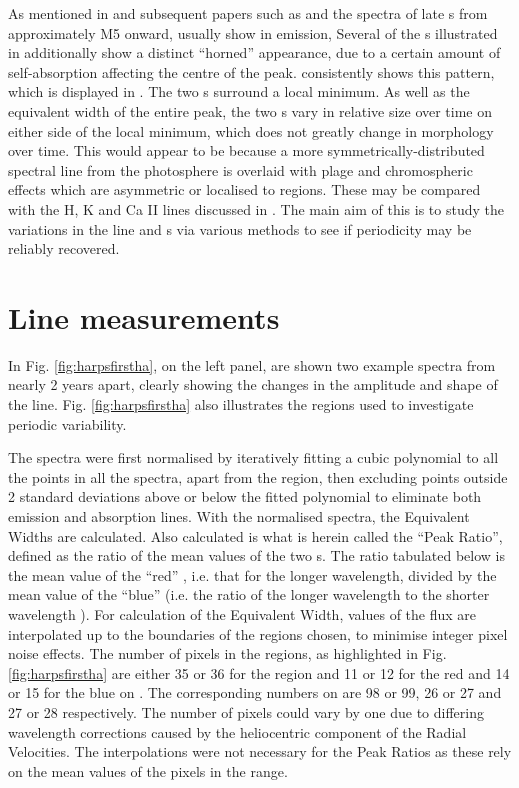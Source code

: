 As mentioned in \citet{mohanty03} and subsequent papers such as \citet{jenkins09} and \citet{barnes14} the spectra of
late \rdwarf s from approximately M5 onward, usually show {\ha} in emission, Several of the \rdwarf s illustrated in
\citet[Fig. 6]{barnes14} additionally show a distinct ``horned'' appearance, due to a certain amount of self-absorption
affecting the centre of the {\ha} peak. {\prox} consistently shows this pattern, which is displayed in
\citet[fig. 14]{fuhrmeister11}. The two \horn s surround a local minimum. As well as the equivalent width of the entire
{\ha} peak, the two \horn s vary in relative size over time on either side of the local minimum, which does not greatly
change in morphology over time. This would appear to be because a more symmetrically-distributed spectral line from the
photosphere is overlaid with plage and chromospheric effects which are asymmetric or localised to regions. These may be
compared with the H, K and Ca II lines discussed in \citet{rauscher06}. The main aim of this {\paperorthesis} is to
study the variations in the line and \horn s via various methods to see if periodicity may be reliably recovered.

\section{{\ha} Line measurements}
\protect\label{section:linemeas}

In Fig. \ref{fig:harpsfirstha}, on the left panel, are shown two example spectra from {\harps} nearly 2 years apart,
clearly showing the changes in the amplitude and shape of the {\ha} line. Fig. \ref{fig:harpsfirstha} also illustrates
the regions used to investigate periodic variability.

The spectra were first normalised by iteratively fitting a cubic polynomial to all the points in all the spectra, apart
from the {\ha} region, then excluding points outside 2 standard deviations above or below the fitted polynomial to
eliminate both emission and absorption lines. With the normalised spectra, the Equivalent Widths are calculated. Also
calculated is what is herein called the ``Peak Ratio'', defined as the ratio of the mean values of the two \horn s. The
ratio tabulated below is the mean value of the ``red'' \horn, i.e. that for the longer wavelength, divided by the mean
value of the ``blue'' {\horn} (i.e. the ratio of the longer wavelength to the shorter wavelength \horn). For calculation
of the Equivalent Width, values of the flux are interpolated up to the boundaries of the regions chosen, to minimise
integer pixel noise effects. The number of pixels in the regions, as highlighted in Fig. \ref{fig:harpsfirstha} are
either 35 or 36 for the {\ha} region and 11 or 12 for the red {\horn} and 14 or 15 for the blue {\horn} on {\uves}. The
corresponding numbers on {\harps} are 98 or 99, 26 or 27 and 27 or 28 respectively. The number of pixels could vary by
one due to differing wavelength corrections caused by the heliocentric component of the Radial Velocities. The
interpolations were not necessary for the Peak Ratios as these rely on the mean values of the pixels in the range.

